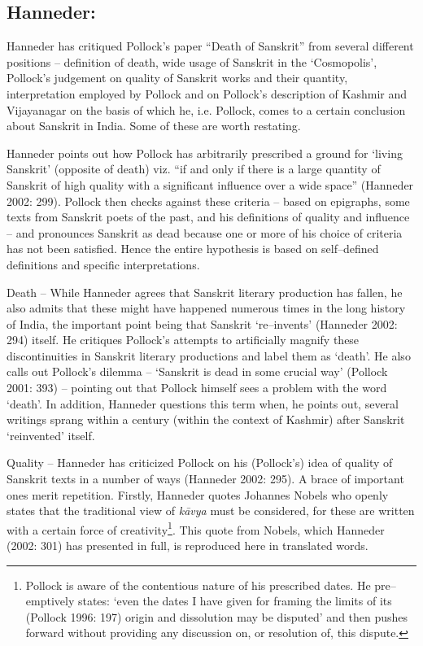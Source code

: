 \subsection*{Hanneder:}

Hanneder has critiqued Pollock’s paper “Death of Sanskrit” from several different positions – definition of death, wide usage of Sanskrit in the ‘Cosmopolis’, Pollock’s judgement on quality of Sanskrit works and their quantity, interpretation employed by Pollock and on Pollock’s description of Kashmir and Vijayanagar on the basis of which he, i.e. Pollock, comes to a certain conclusion about Sanskrit in India. Some of these are worth restating.

Hanneder points out how Pollock has arbitrarily prescribed a ground for ‘living Sanskrit’ (opposite of death) viz. “if and only if there is a large quantity of Sanskrit of high quality with a significant influence over a wide space” (Hanneder 2002: 299). Pollock then checks against these criteria – based on epigraphs, some texts from Sanskrit poets of the past, and his definitions of quality and influence – and pronounces Sanskrit as dead because one or more of his choice of criteria has not been satisfied. Hence the entire hypothesis is based on self–defined definitions and specific interpretations.

\item Death – While Hanneder agrees that Sanskrit literary production has fallen, he also admits that these might have happened numerous times in the long history of India, the important point being that Sanskrit ‘re–invents’ (Hanneder 2002: 294) itself. He critiques Pollock’s attempts to artificially magnify these discontinuities in Sanskrit literary productions and label them as ‘death’. He also calls out Pollock’s dilemma – ‘Sanskrit is dead in some crucial way’ (Pollock 2001: 393) – pointing out that Pollock himself sees a problem with the word ‘death’. In addition, Hanneder questions this term when, he points out, several writings sprang within a century (within the context of Kashmir) after Sanskrit ‘reinvented’ itself.

 \item Quality – Hanneder has criticized Pollock on his (Pollock’s) idea of quality of Sanskrit texts in a number of ways (Hanneder 2002: 295). A brace of important ones merit repetition. Firstly, Hanneder quotes Johannes Nobels who openly states that the traditional view of \textit{kāvya} must be considered, for these are written with a certain force of creativity\footnote{ Pollock is aware of the contentious nature of his prescribed dates. He pre–emptively states: ‘even the dates I have given for framing the limits of its (Pollock 1996: 197) origin and dissolution may be disputed’ and then pushes forward without providing any discussion on, or resolution of, this dispute.}. This quote from Nobels, which Hanneder (2002: 301) has presented in full, is reproduced here in translated words.



